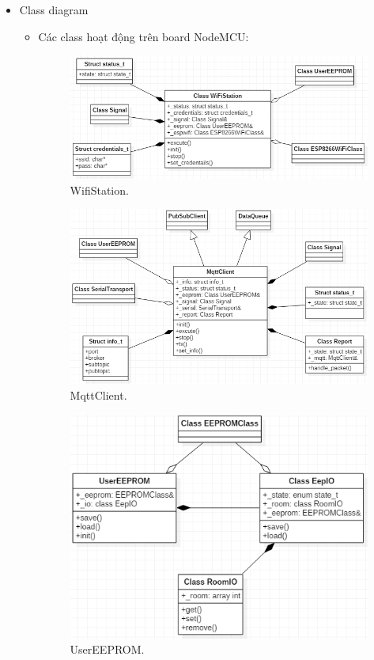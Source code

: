 \documentclass[a4paper,12pt,oneside]{article}
\begin{document}
\begin{itemize}
\newpage
\item Class diagram

\begin{itemize}
	\item Các class hoạt động trên board NodeMCU:
	
	\begin{figure}[H]
		\centering
		\includegraphics[scale=.85]{hinh/class_wifistation.PNG}
		\caption{WifiStation.}
	\end{figure}

\begin{figure}[H]
\centering
\includegraphics[scale=.85]{hinh/class_mqttclient.PNG}
\caption{MqttClient.}
\end{figure}

\begin{figure}[H]
\centering
\includegraphics[scale=.85]{hinh/class_usereeprom.PNG}
\caption{UserEEPROM.}
\end{figure}


\end{itemize}
\end{itemize}
\end{document}
